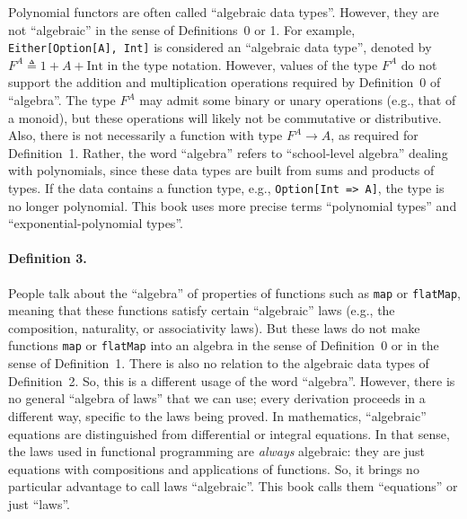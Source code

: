 Polynomial functors are often called \textquotedblleft algebraic data
types\textquotedblright . However, they are not \textquotedblleft algebraic\textquotedblright{}
in the sense of Definitions~0 or 1. For example, \lstinline!Either[Option[A], Int]!
is considered an \textquotedblleft algebraic data type\textquotedblright ,
denoted by $F^{A}\triangleq1+A+\text{Int}$ in the type notation.
However, values of the type $F^{A}$ do not support the addition and
multiplication operations required by Definition~0 of \textsf{``}algebra\textsf{''}.
The type $F^{A}$ may admit some binary or unary operations (e.g.,
that of a monoid), but these operations will likely not be commutative
or distributive. Also, there is not necessarily a function with type
$F^{A}\rightarrow A$, as required for Definition~1. Rather, the
word \textsf{``}algebra\textsf{''} refers to \textsf{``}school-level algebra\textsf{''} dealing with
polynomials, since these data types are built from sums and products
of types. If the data contains a function type, e.g., \lstinline!Option[Int => A]!,
the type is no longer polynomial. This book uses more precise terms
\textquotedblleft polynomial types\textquotedblright{} and \textquotedblleft exponential-polynomial
types\textquotedblright .

\paragraph{Definition 3.}

People talk about the \textquotedblleft algebra\textquotedblright{}
of properties of functions such as \lstinline!map! or \lstinline!flatMap!,
meaning that these functions satisfy certain \textsf{``}algebraic\textsf{''} laws
(e.g., the composition, naturality, or associativity laws). But these
laws do not make functions \lstinline!map! or \lstinline!flatMap!
into an algebra in the sense of Definition~0 or in the sense of Definition~1.
There is also no relation to the algebraic data types of Definition~2.
So, this is a different usage of the word \textsf{``}algebra\textsf{''}. However,
there is no general \textsf{``}algebra of laws\textsf{''} that we can use; every derivation
proceeds in a different way, specific to the laws being proved. In
mathematics, \textsf{``}algebraic\textsf{''} equations are distinguished from differential
or integral equations. In that sense, the laws used in functional
programming are \emph{always} algebraic: they are just equations with
compositions and applications of functions. So, it brings no particular
advantage to call laws \textsf{``}algebraic\textsf{''}. This book calls them \textsf{``}equations\textsf{''}
or just \textsf{``}laws\textsf{''}.


